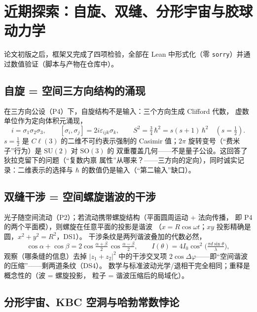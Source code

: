 \documentclass[aps,prd,preprint,superscriptaddress,amsmath,amssymb]{revtex4-2}
\begin{document}
\section{近期探索：自旋、双缝、分形宇宙与胶球动力学}\label{sec:explorations}

论文初版之后，框架又完成了四项检验，全部在 Lean 中形式化（零
\texttt{sorry}）并通过数值验证（脚本与产物在仓库中）。

\subsection{自旋 = 空间三方向结构的涌现}

在三方向公设（P4）下，自旋结构不是输入：三个方向生成 Clifford 代数，
虚数单位作为定向体积元涌现，
\begin{equation}
i = \sigma_1\sigma_2\sigma_3 , \qquad
[\sigma_i,\sigma_j] = 2i\varepsilon_{ijk}\sigma_k , \qquad
S^2 = \tfrac34\,\hbar^2 = s(s{+}1)\,\hbar^2 \quad (s=\tfrac12) .
\end{equation}
$s=\tfrac12$ 是 $C\ell(3)$ 的二维不可约表示强制的 Casimir 值；$2\pi$
旋转变号（``费米子''行为）是 $\mathrm{SU}(2)$ 对 $\mathrm{SO}(3)$ 的
双重覆盖几何——不是量子公设。这回答了狄拉克留下的问题（``复数内禀
属性''从哪来？——三方向的定向），同时诚实记录：二维表示的选择与
$\hbar$ 的数值仍是输入（``第二输入''缺口）。

\subsection{双缝干涉 = 空间螺旋谐波的干涉}

光子随空间流动（P2）；若流动携带螺旋结构（平面圆周运动 + 法向传播，
即 P4 的两个平面模），则螺旋在任意平面的投影是谐波
（$x=R\cos\omega t$；$xy$ 投影精确是圆，$x^2+y^2=R^2$，DS1）。
干涉条纹是两列谐波叠加的代数必然，
\begin{equation}
\cos\alpha+\cos\beta=2\cos\!\tfrac{\alpha+\beta}{2}\,\cos\!\tfrac{\alpha-\beta}{2},
\qquad I(\theta)=4I_0\cos^2\!\big(\tfrac{\pi d\sin\theta}{\lambda}\big),
\end{equation}
观察（哪条缝的信息）去掉 $|z_1+z_2|^2$ 中的干涉交叉项
$2\cos\Delta\varphi$——即``空间谐波的压缩''——剩两道条纹（DS4）。
数学与标准波动光学/退相干完全相同；重释是概念性的（波 = 螺旋投影，
粒子 = 谐波压缩后的局域化）。

\subsection{分形宇宙、KBC 空洞与哈勃常数悖论}
\end{document}
